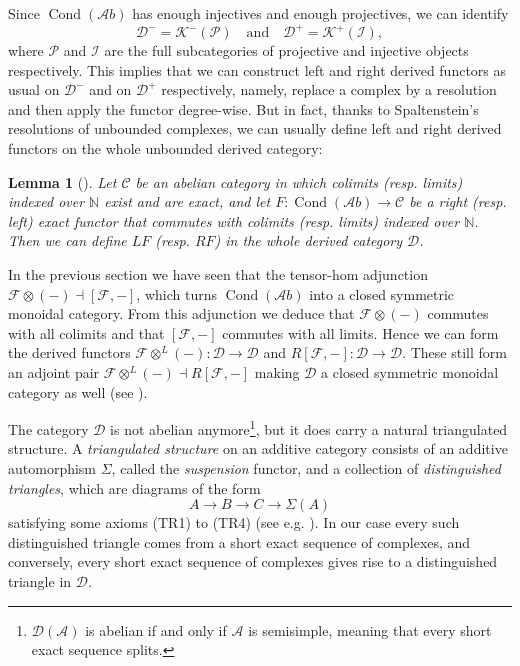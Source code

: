 \documentclass[11pt,A4]{article}
\theoremstyle{plain}
\newtheorem{lm}[thm]{Lemma}
\theoremstyle{definition}
\theoremstyle{remark}
\newcommand{\N}{\mathbb{N}}
\newcommand{\1}{\mathbbm{1}}
\newcommand{\F}{\mathcal{F}}
\newcommand{\scrC}{\mathscr{C}}
\newcommand{\Ab}{\mathscr{A}b}
\newcommand{\D}{\mathscr{D}}
\newcommand{\K}{\mathscr{K}}
\DeclareMathOperator{\Cond}{Cond}
\newcommand{\ot}{\otimes}
\begin{document}
Since $\Cond(\Ab)$ has enough injectives and enough projectives, we can identify
\[ \D^{-}=\K^{-}(\mathscr{P}) \quad \text{and} \quad \D^{+}=\K^{+}(\mathscr{I}),\]
where $\mathscr{P}$ and $\mathscr{I}$ are the full subcategories of projective and injective objects respectively.
This implies that we can construct left and right derived functors as usual on $\D^{-}$ and on $\D^{+}$ respectively, namely, replace a complex by a resolution and then apply the functor degree-wise.
But in fact, thanks to Spaltenstein's resolutions of unbounded complexes, we can usually define left and right derived functors on the whole unbounded derived category:

\begin{lm}[{\cite[\href{https://stacks.math.columbia.edu/tag/0794}{Tag 0794}]{sta19}}]
    Let $\scrC$ be an abelian category in which colimits (resp. limits) indexed over $\N$ exist and are exact, and let $F\colon \Cond(\Ab)\to \scrC$ be a right (resp. left) exact functor that commutes with colimits (resp. limits) indexed over $\N$.
    Then we can define $LF$ (resp. $RF$) in the whole derived category $\D$.
\end{lm}

In the previous section we have seen that the tensor-hom adjunction $\F\ot (-)\dashv [\F,-]$, which turns $\Cond(\Ab)$ into a closed symmetric monoidal category.
From this adjunction we deduce that $\F\ot (-)$ commutes with all colimits and that $[\F,-]$ commutes with all limits.
Hence we can form the derived functors $\F\ot^{L}(-)\colon \D\to \D$ and $R[\F,-]\colon \D\to \D$.
These still form an adjoint pair $\F\ot^{L}(-)\dashv R[\F,-]$ making $\D$ a closed symmetric monoidal category as well (see \cite[\href{https://stacks.math.columbia.edu/tag/09T5}{Tag 09T5}]{sta19}).

The category $\D$ is not abelian anymore\footnote{$\D(\mathscr{A})$ is abelian if and only if $\mathscr{A}$ is semisimple, meaning that every short exact sequence splits.}, but it does carry a natural triangulated structure.
A \textit{triangulated structure} on an additive category consists of an additive automorphism $\Sigma$, called the \textit{suspension} functor, and a collection of \textit{distinguished triangles}, which are diagrams of the form
\[ A\to B\to C\to\Sigma(A) \]
satisfying some axioms (TR1) to (TR4) (see e.g. \cite{gm03}).
In our case every such distinguished triangle comes from a short exact sequence of complexes, and conversely, every short exact sequence of complexes gives rise to a distinguished triangle in $\D$.
\end{document}
